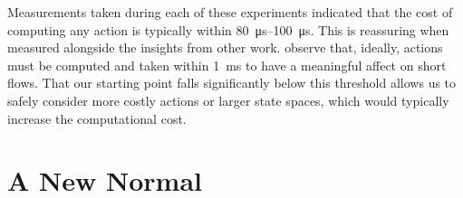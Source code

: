 \documentclass[conference, letterpaper, 10pt, times]{IEEEtran}
\begin{document}
Measurements taken during each of these experiments indicated that the cost of computing any action is typically within \SIrange{80}{100}{\micro\second}.
This is reassuring when measured alongside the insights from other work.
\Textcite{DBLP:conf/sigcomm/ChenL0L18} observe that, ideally, actions must be computed and taken within \SI{1}{\milli\second} to have a meaningful affect on short flows.
That our starting point falls significantly below this threshold allows us to safely consider more costly actions or larger state spaces, which would typically increase the computational cost.

%

\section{A New Normal}\label{sec:a-new-normal}

%
\end{document}
